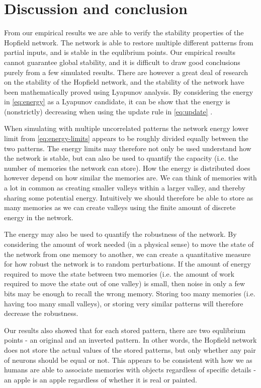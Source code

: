 \section{Discussion and conclusion}

From our empirical results we are able to verify the stability properties of the Hopfield network. The network is able to restore multiple different patterns from partial inputs, and is stable in the equlibrium points. Our empirical results cannot guarantee global stability, and it is difficult to draw good conclusions purely from a few simulated results. There are however a great deal of research on the stability of the Hopfield network, and the stability of the network have been mathematically proved using Lyapunov analysis. By considering the energy in \cref{eq:energy} as a Lyapunov candidate, it can be show that the energy is (nonstrictly) decreasing when using the update rule in \cref{eq:update} \cite{lyapnuv-stability}.

When simulating with multiple uncorrelated patterns the network energy lower limit from \cref{eq:energy-limits} appears to be roughly divided equally between the two patterns. The energy limits may therefore not only be used understand how the network is stable, but can also be used to quantify the capacity (i.e. the number of memories the network can store). How the energy is distributed does however depend on how similar the memories are. We can think of memories with a lot in common as creating smaller valleys within a larger valley, and thereby sharing some potential energy. Intuitively we should therefore be able to store as many memories as we can create valleys using the finite amount of discrete energy in the network.

The energy may also be used to quantify the robustness of the network. By considering the amount of work needed (in a physical sense) to move the state of the network from one memory to another, we can create a quantitative measure for how robust the network is to random perturbations. If the amount of energy required to move the state between two memories (i.e. the amount of work required to move the state out of one valley) is small, then noise in only a few bits may be enough to recall the wrong memory. Storing too many memories (i.e. having too many small valleys), or storing very similar patterns will therefore decrease the robustness.

Our results also showed that for each stored pattern, there are two equlibrium points - an original and an inverted pattern. In other words, the Hopfield network does not store the actual values of the stored patterns, but only whether any pair of neurons should be equal or not. This appears to be consistent with how we as humans are able to associate memories with objects regardless of specific details - an apple is an apple regardless of whether it is real or painted. 

